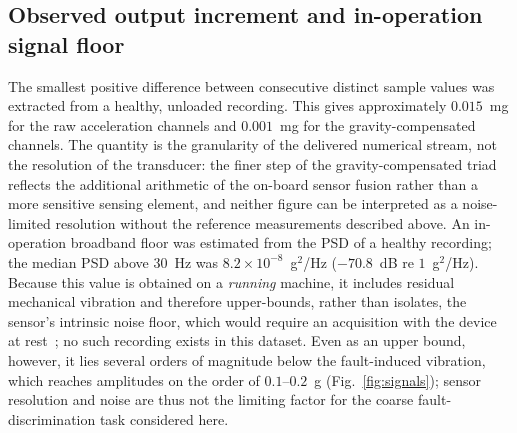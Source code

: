\subsection{Observed output increment and in-operation signal floor}
The smallest positive difference between consecutive distinct sample values was
extracted from a healthy, unloaded recording. This gives approximately
$0.015$~mg for the raw acceleration channels and $0.001$~mg for the
gravity-compensated channels. The quantity is the granularity of the delivered
numerical stream, not the resolution of the transducer: the finer step of the
gravity-compensated triad reflects the additional arithmetic of the on-board
sensor fusion rather than a more sensitive sensing element, and neither figure
can be interpreted as a noise-limited resolution without the reference
measurements described above. An in-operation broadband floor was estimated from the
PSD of a healthy recording; the median PSD above
$30$~Hz was $8.2\times10^{-8}$~g$^2$/Hz ($-70.8$~dB re $1$~g$^2$/Hz). Because this
value is obtained on a \emph{running} machine, it includes residual mechanical
vibration and therefore upper-bounds, rather than isolates, the sensor's
intrinsic noise floor, which would require an acquisition with the device at
rest~\cite{srokosz2024mems, capuano2023smartphone}; no such recording exists in
this dataset. Even as an upper bound, however, it lies several orders of magnitude
below the fault-induced vibration, which reaches amplitudes on the order of
$0.1$--$0.2$~g (Fig.~\ref{fig:signals}); sensor resolution and noise are thus not
the limiting factor for the coarse fault-discrimination task considered here.

